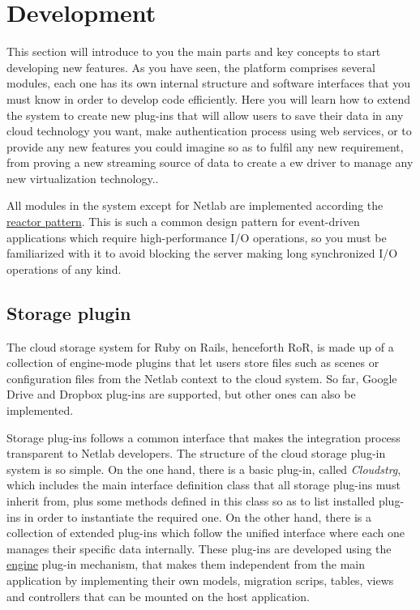 \documentclass{article}
\begin{document}
\section{Development}
\label{sec:Development}
This section will introduce to you the main parts and key concepts to start developing new features. As you have seen, the platform comprises several modules, each one has its own internal structure and software interfaces that you must know in order to develop code efficiently. Here you will learn how to extend the system to create new plug-ins that will allow users to save their data in any cloud technology you want, make authentication process using web services, or to provide any new features you could imagine so as to fulfil any new requirement, from proving a new streaming source of data to create a ew driver to manage any new virtualization technology..

All modules in the system except for Netlab are implemented according the \href{http://www.dre.vanderbilt.edu/~schmidt/PDF/reactor-siemens.pdf}{reactor pattern}. This is such a common design pattern for event-driven applications which require high-performance I/O operations, so you must be familiarized with it to avoid blocking the server making long synchronized I/O operations of any kind.
 
\subsection{Storage plugin}
The cloud storage system for Ruby on Rails, henceforth RoR, is made up of a collection of engine-mode plugins that let users store files such as scenes or configuration files from the Netlab context to the cloud system. So far, Google Drive and Dropbox plug-ins are supported, but other ones can also be implemented.

Storage plug-ins follows a common interface that makes the integration process transparent to Netlab developers. The structure of the cloud storage plug-in system is so simple. On the one hand, there is a basic plug-in, called \textit{Cloudstrg}, which includes the main interface definition class that all storage plug-ins must inherit from, plus some methods defined in this class so as to list installed plug-ins in order to instantiate the required one. On the other hand, there is a collection of extended plug-ins which follow the unified interface where each one manages their specific data internally. These plug-ins are developed using the \href{http://guides.rubyonrails.org/engines.html}{engine} plug-in mechanism, that makes them independent from the main application by implementing their own models, migration scrips, tables, views and controllers that can be mounted on the host application.
\end{document}
